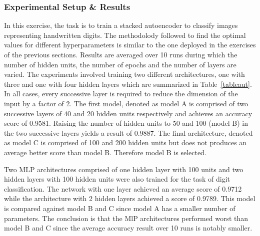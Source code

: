 \documentclass[conference,compsoc]{IEEEtran}
\begin{document}
\subsubsection{Experimental Setup \& Results}

In this exercise, the task is to train a stacked autoencoder to classify images representing handwritten digits. The methodolody followed to find the optimal values for different hyperparameters is similar to the one deployed in the exercises of the previous sections. Results are averaged over 10 runs during which the number of hidden units, the number of epochs and the number of layers are varied. The experiments involved training two different architectures, one with three and one with four hidden layers which are summarized in Table~\ref{tableaut}. In all cases, every successive layer is required to reduce the dimension of the input by a factor of 2. The first model, denoted as model A is comprised of two successive layers of 40 and 20 hidden units respectively and achieves an accuracy score of 0.9581. Raising the number of hidden units to 50 and 100 (model B) in the two successive layers yields a result of 0.9887. The final architecture, denoted as model C is comprised of 100 and 200 hidden units but does not produces an average better score than model B. Therefore model B is selected. 

Two MLP architectures comprised of one hidden layer with 100 units and two hidden layers with 100 hidden units were also trained for the task of digit classification. The network with one layer achieved an average score of 0.9712 while the architecture with 2 hidden layers achieved a score of 0.9789. This model is compared against model B and C since model A has a smaller number of parameters. The conclusion is that the MlP architectures performed worst than model B and C since the average accuracy result over 10 runs is notably smaller.
\end{document}

